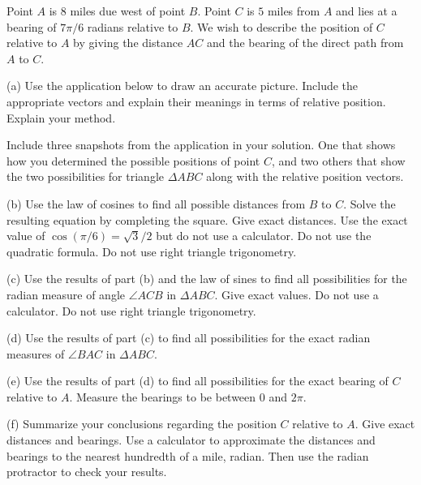 \documentclass{ximera}
\begin{document}
\begin{question}  \label{Qdf45g5t653}
Point $A$ is $8$ miles due west of point $B$. Point $C$ is $5$ miles from $A$ and lies at a bearing of $7\pi/6$ radians relative to $B$. We wish to describe the position of $C$ relative to $A$ by giving the distance $AC$ and the bearing of the direct path from $A$ to $C$.

(a) Use the application below to draw an accurate picture. Include the appropriate vectors and explain their meanings in terms of relative position. Explain your method. 

Include three snapshots from the application in your solution. One that shows how you determined the possible positions of point $C$, and two others that show the two possibilities for triangle $\Delta ABC$ along with the relative position vectors. 

(b) Use the law of cosines to find all possible distances from $B$ to $C$. Solve the resulting equation by completing the square. Give exact distances. Use the exact value of $\cos (\pi/6) = \sqrt{3}/2$ but do not use a calculator. Do not use the quadratic formula. Do not  use right triangle trigonometry. 

(c) Use the results of part (b) and the law of sines to find all possibilities for the radian measure of angle $\angle ACB$ in $\Delta ABC$. Give exact values. Do not use a calculator. Do not use right triangle trigonometry.

(d) Use the results of part (c) to find all possibilities for the exact radian measures of $\angle BAC$ in $\Delta ABC$. 

(e) Use the results of part (d) to find all possibilities for the exact bearing of $C$ relative to $A$. Measure the bearings to be between $0$ and $2\pi$.


(f) Summarize your conclusions regarding the position $C$ relative to $A$. Give exact distances and bearings. Use a calculator to approximate the distances and bearings to the nearest hundredth of a mile, radian. Then use the radian protractor to check your results.

 
\begin{onlineOnly}
    \begin{center}
\end{center}
\end{onlineOnly}
\end{question}
\end{document}
